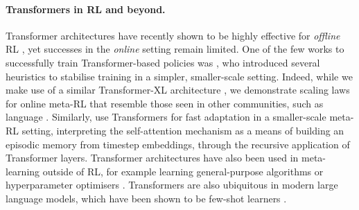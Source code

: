 \documentclass[11pt, a4paper, logo, copyright]{deepmind}
\begin{document}
\paragraph{Transformers in RL and beyond.} Transformer architectures have recently shown to be highly effective for  \emph{offline} RL \citep{chen2020decision, janner2021sequence, reed2022a}, yet successes in the \emph{online} setting remain limited. One of the few works to successfully train Transformer-based policies was \citet{parisotto2020stabilizing}, who introduced several heuristics to stabilise training in a simpler, smaller-scale setting. Indeed, while we make use of a similar Transformer-XL architecture \citep{vaswani2017attention, dai2019transformer}, we demonstrate scaling laws for online meta-RL that resemble those seen in other communities, such as language \citep{DevlinCLT19, kaplan2020scaling, brown2020gpt3, rae2021scaling}. Similarly, \citet{melo2022transformers} use Transformers for fast adaptation in a smaller-scale meta-RL setting, interpreting the self-attention mechanism as a means of building an episodic memory from timestep embeddings, through the recursive application of Transformer layers. Transformer architectures have also been used in meta-learning outside of RL, for example learning general-purpose algorithms \citep{kirsch2022general} or hyperparameter optimisers \citep{optformer}. Transformers are also ubiquitous in modern large language models, which have been shown to be few-shot learners \citep{brown2020gpt3}.
\end{document}

